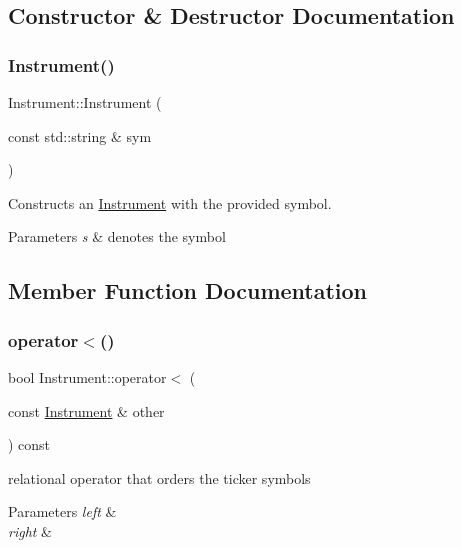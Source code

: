 \subsection{Constructor \& Destructor Documentation}
\mbox{\label{classInstrument_af6112f02c5739bd166b78a1734e79b2c}} 
\subsubsection{\texorpdfstring{Instrument()}{Instrument()}}
{\footnotesize\ttfamily Instrument\+::\+Instrument (\begin{DoxyParamCaption}\item[{const std\+::string \&}]{sym }\end{DoxyParamCaption})}



Constructs an \hyperlink{classInstrument}{Instrument} with the provided symbol. 


\begin{DoxyParams}{Parameters}
{\em s} & denotes the symbol \\
\hline
\end{DoxyParams}


\subsection{Member Function Documentation}
\mbox{\label{classInstrument_a8ffc6368e7b12588e422145f2b659f9e}} 
\subsubsection{\texorpdfstring{operator$<$()}{operator<()}}
{\footnotesize\ttfamily bool Instrument\+::operator$<$ (\begin{DoxyParamCaption}\item[{const \hyperlink{classInstrument}{Instrument} \&}]{other }\end{DoxyParamCaption}) const}



relational operator that orders the ticker symbols 


\begin{DoxyParams}{Parameters}
{\em left} & \\
\hline
{\em right} & \\
\hline
\end{DoxyParams}
\mbox{\label{classInstrument_a5fff991d72c20b0def886d743b6ae0b3}} 
